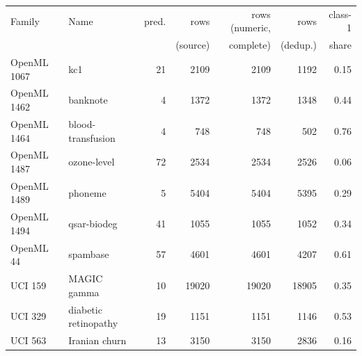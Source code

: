 \begin{tabular}{llrrrrr}\toprule
Family & Name & pred. & rows & rows (numeric, & rows & class-1\\
 & & & (source) & complete) & (dedup.) & share\\\midrule
OpenML 1067 & kc1 & 21 & 2109 & 2109 & 1192 & 0.15\\
OpenML 1462 & banknote & 4 & 1372 & 1372 & 1348 & 0.44\\
OpenML 1464 & blood-transfusion & 4 & 748 & 748 & 502 & 0.76\\
OpenML 1487 & ozone-level & 72 & 2534 & 2534 & 2526 & 0.06\\
OpenML 1489 & phoneme & 5 & 5404 & 5404 & 5395 & 0.29\\
OpenML 1494 & qsar-biodeg & 41 & 1055 & 1055 & 1052 & 0.34\\
OpenML 44 & spambase & 57 & 4601 & 4601 & 4207 & 0.61\\
UCI 159 & MAGIC gamma & 10 & 19020 & 19020 & 18905 & 0.35\\
UCI 329 & diabetic retinopathy & 19 & 1151 & 1151 & 1146 & 0.53\\
UCI 563 & Iranian churn & 13 & 3150 & 3150 & 2836 & 0.16\\
\bottomrule\end{tabular}
